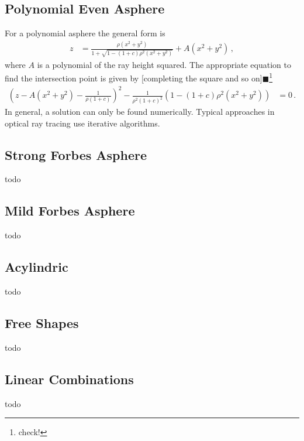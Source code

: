\documentclass[12pt,a4paper,twoside,openright,BCOR10mm,headsepline,titlepage,abstracton,chapterprefix,final]{scrreprt}
\newcommand{\remark}[1]{{\color{red}$\blacksquare$}\footnote{{\color{red}#1}}}
\begin{document}
\subsection{Polynomial Even Asphere}

For a polynomial asphere the general form is
\begin{align}
  z &=  \frac
 { \rho ( x^2 + y^2 ) }
 { 1 + \sqrt{1 - (1+c) \rho^2  (x^2 + y^2)} } + A(x^2 + y^2)\,,
\end{align}
where $A$ is a polynomial of the ray height squared.
The appropriate equation to find the intersection point is given by [completing the square and so on]\remark{check!}
\begin{align}
 \left(z - A(x^2 + y^2) - \frac{1}{\rho(1+c)}\right)^2 - \frac{1}{\rho^2 (1+c)^2} \left(1 -(1+c)\rho^2 (x^2 + y^2) \right) &= 0\,.
\end{align}
In general, a solution can only be found numerically. 
Typical approaches in optical ray tracing use iterative algorithms.

\subsection{Strong Forbes Asphere}
todo
\subsection{Mild Forbes Asphere}
todo
\subsection{Acylindric}
todo

\subsection{Free Shapes}
todo

\subsection{Linear Combinations}
todo
\end{document}
